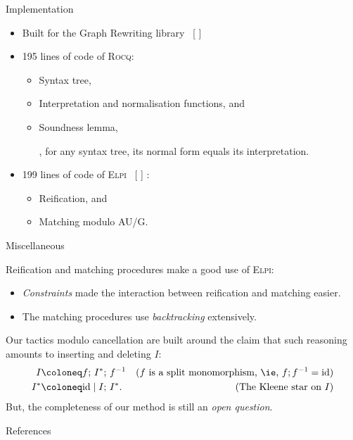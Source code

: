 \documentclass[12pt, aspectratio=169]{beamer}
\let\OrigCite\cite
\renewcommand*\cite[2][]{%
  {%
    \color{_note}%
    [\if\relax\detokenize{#1}\relax
      \OrigCite{#2}%
    \else
      \OrigCite[#1]{#2}%
    \fi]
  }%
}
\newcommand{\Rocq}{{\scshape Rocq}\xspace}
\newcommand{\Elpi}{{\scshape Elpi}\xspace}
\begin{document}
\begin{frame}{Implementation}

  \begin{itemize}
  \item Built for the Graph Rewriting library~\cite{DBLP:conf/cpp/ArsacHP26}
  \item 195 lines of code of \Rocq:
    \begin{itemize}
    \item Syntax tree,
    \item Interpretation and normalisation functions, and
    \item Soundness lemma,

      \ie, for any syntax tree, its normal form equals its interpretation.
    \end{itemize}
  \item 199 lines of code of \Elpi~\cite{Tassi:habilitation}:
    \begin{itemize}
    \item Reification, and
    \item Matching modulo AU/G.
    \end{itemize}
  \end{itemize}

\end{frame}

\begin{frame}{Miscellaneous}

  Reification and matching procedures make a good use of \Elpi:
  \begin{itemize}
  \item \emph{Constraints} made the interaction between reification and matching easier.
  \item The matching procedures use \emph{backtracking} extensively.
  \end{itemize}

  \bigskip

  Our tactics modulo cancellation are built around the claim that such reasoning amounts to
  inserting and deleting $I$:
  \begin{align*}
    I
    &\coloneq f; \, I^*; \, f^{-1}
    & \text{($f$ is a split monomorphism, \ie, $f; f^{-1} = \mathrm{id}$)} \\
    I^*
    &\coloneq \mathrm{id} \mid I; \, I^*.
    & \text{(The Kleene star on $I$)}
  \end{align*}
  But, the completeness of our method is still an \emph{open question}.

\end{frame}

\appendix

\begin{frame}[allowframebreaks]{References}
 \printbibliography
\end{frame}
\end{document}
